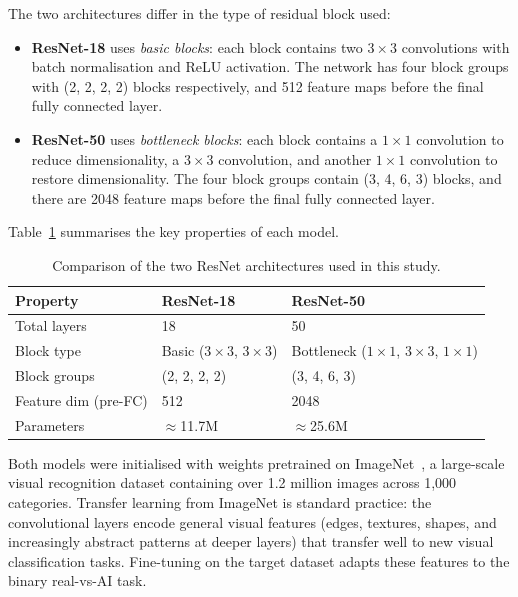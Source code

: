 The two architectures differ in the type of residual block used:
\begin{itemize}
  \item \textbf{ResNet-18} uses \textit{basic blocks}: each block contains two $3 \times 3$
        convolutions with batch normalisation and ReLU activation. The network has four block
        groups with (2, 2, 2, 2) blocks respectively, and 512 feature maps before the final
        fully connected layer.
  \item \textbf{ResNet-50} uses \textit{bottleneck blocks}: each block contains a $1 \times 1$
        convolution to reduce dimensionality, a $3 \times 3$ convolution, and another
        $1 \times 1$ convolution to restore dimensionality. The four block groups contain
        (3, 4, 6, 3) blocks, and there are 2048 feature maps before the final fully connected
        layer.
\end{itemize}

Table~\ref{tab:architectures} summarises the key properties of each model.

\begin{table}[tb]
  \centering
  \caption{Comparison of the two ResNet architectures used in this study.}
  \label{tab:architectures}
  \begin{tabular}{lll}
    \hline
    \textbf{Property} & \textbf{ResNet-18} & \textbf{ResNet-50} \\
    \hline
    Total layers        & 18               & 50 \\
    Block type          & Basic ($3{\times}3$, $3{\times}3$) & Bottleneck ($1{\times}1$, $3{\times}3$, $1{\times}1$) \\
    Block groups        & (2, 2, 2, 2)     & (3, 4, 6, 3) \\
    Feature dim (pre-FC) & 512             & 2048 \\
    Parameters          & $\approx$11.7M  & $\approx$25.6M \\
    \hline
  \end{tabular}
\end{table}

Both models were initialised with weights pretrained on ImageNet~\cite{deng2009imagenet}, a large-scale visual
recognition dataset containing over 1.2 million images across 1,000 categories. Transfer
learning from ImageNet is standard practice: the convolutional layers encode general visual
features (edges, textures, shapes, and increasingly abstract patterns at deeper layers)
that transfer well to new visual classification tasks. Fine-tuning on the target dataset adapts
these features to the binary real-vs-AI task.

